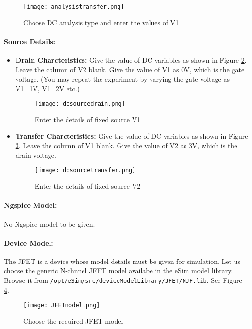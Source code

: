 \begin{figure}[h]
\centering
\texttt{[image: analysistransfer.png]}
\caption{Choose DC analysis type and enter the values of V1}
\label{analysistransfer}
\end{figure}
\paragraph{Source Details:} 
\begin{itemize}
\item \textbf{Drain Charcteristics:} Give the value of DC variables as shown in Figure \ref{dcsourcedrain}. Leave the column of V2 blank. Give the value of V1 as 0V, which is the gate voltage. (You may repeat the experiment by varying the gate voltage as V1=1V, V1=2V etc.)
\begin{figure}[h]
\centering
\texttt{[image: dcsourcedrain.png]}
\caption{Enter the details of fixed source V1}
\label{dcsourcedrain}
\end{figure}

\item \textbf{Transfer Charcteristics:} Give the value of DC variables as shown in Figure \ref{dcsourcetransfer}. Leave the column of V1 blank. Give the value of V2 as 3V, which is the drain voltage. 
\begin{figure}[h]
\centering
\texttt{[image: dcsourcetransfer.png]}
\caption{Enter the details of fixed source V2}
\label{dcsourcetransfer}
\end{figure}

\end{itemize}

\paragraph{Ngspice Model:} No Ngspice model to be given.

\paragraph{Device Model:} The JFET is a device whose model details must be given for simulation. Let us choose the generic N-chnnel JFET model availabe in the eSim model library. Browse it from \texttt{/opt/eSim/src/deviceModelLibrary/JFET/NJF.lib}. See Figure \ref{JFETmodel}.
\begin{figure}[h]
\centering
\texttt{[image: JFETmodel.png]}
\caption{Choose the required JFET model}
\label{JFETmodel}
\end{figure}

